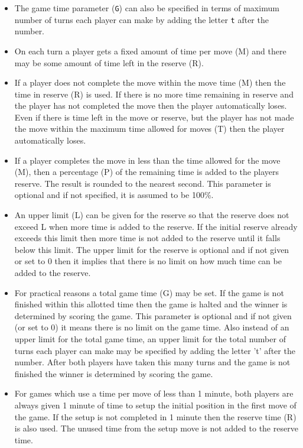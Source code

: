 \documentclass[10pt,dvipdfmx]{report}
\begin{document}
\begin{itemize}
\item
The game time parameter ({\tt G}) can also be specified in terms
  of maximum number of turns each player can make by adding
  the letter {\tt t} after the number.
\item
On each turn a player gets a fixed amount of time per 
  move (M) and there may be some amount of time left 
  in the reserve (R).
\item
If a player does not complete the move within the move
  time (M) then the time in reserve (R) is used.  If there is
  no more time remaining in reserve and the player has
  not completed the move then the player automatically loses.
  Even if there is time left in the move or reserve, but the player
  has not made the move within the maximum time allowed
  for moves (T) then the player automatically loses.
\item
If a player completes the move in less than the
  time allowed for the move (M), then a percentage (P) of the 
  remaining time is added to the players reserve.   The 
  result is rounded to the nearest second.  This parameter
  is optional and if not specified, it is assumed to be 100\%.
\item
An upper limit (L) can be given for the reserve so that 
  the reserve does not exceed L when more time is added to 
  the reserve.  If the initial reserve already exceeds this
  limit then more time is not added to the reserve until it
  falls below this limit. The upper limit for the reserve is 
  optional and if not given or set to 0 then it implies that 
  there is no limit on how much time can be added to the reserve.
\item
For practical reasons a total game time (G) may be
  set.  If the game is not finished within this allotted time
  then the game is halted and the winner is determined by 
  scoring the game.  This parameter is optional and if
  not given (or set to 0) it means there is no limit on the 
  game time. Also instead of an upper limit for the total
  game time, an upper limit for the total number of turns each
  player can make may be specified by adding the letter 't'
  after the number. After both players have taken this many 
  turns and the game is not finished the winner is determined 
  by scoring the game.
\item
For games which use a time per move of less than 1 minute,
  both players are always given 1 minute of time to setup the
  initial position in the first move of the game.  If the setup
  is not completed in 1 minute then the reserve time (R) is also used.
  The unused time from the setup move is not added to the
  reserve time.
\end{itemize}
\end{document}
